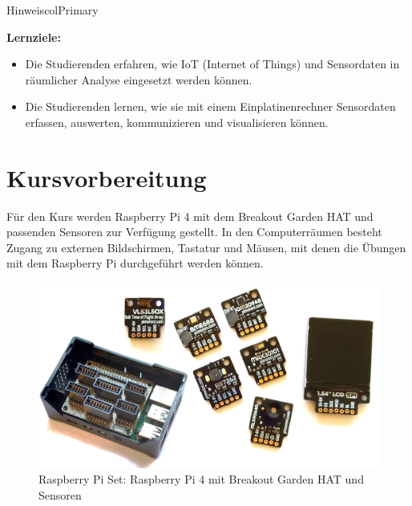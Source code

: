 \documentclass[
  11pt,
  a4paper,
  oneside, openany  ,captions=tableheading
]{scrbook}
\providecommand{\tightlist}{%
  \setlength{\itemsep}{0pt}\setlength{\parskip}{0pt}}
\theoremstyle{remark}
\renewcommand{\markright}[1]{\def\chaptertitle{#1}} %
\begin{document}
\begin{boxtitle}{Hinweis}{colPrimary}

\textbf{Lernziele:}

\begin{itemize}
\tightlist
\item
  Die Studierenden erfahren, wie IoT (Internet of Things) und
  Sensordaten in räumlicher Analyse eingesetzt werden können.
\item
  Die Studierenden lernen, wie sie mit einem Einplatinenrechner
  Sensordaten erfassen, auswerten, kommunizieren und visualisieren
  können.
\end{itemize}

\end{boxtitle}

\section*{Kursvorbereitung}\label{kursvorbereitung}

\markright{Kursvorbereitung}

Für den Kurs werden Raspberry Pi 4 mit dem Breakout Garden HAT und
passenden Sensoren zur Verfügung gestellt. In den Computerräumen besteht
Zugang zu externen Bildschirmen, Tastatur und Mäusen, mit denen die
Übungen mit dem Raspberry Pi durchgeführt werden können.

\begin{figure}[H]

{\centering \includegraphics{images/raspberry_pi_set.jpg}

}

\caption{Raspberry Pi Set: Raspberry Pi 4 mit Breakout Garden HAT und
Sensoren}

\end{figure}%
\end{document}
